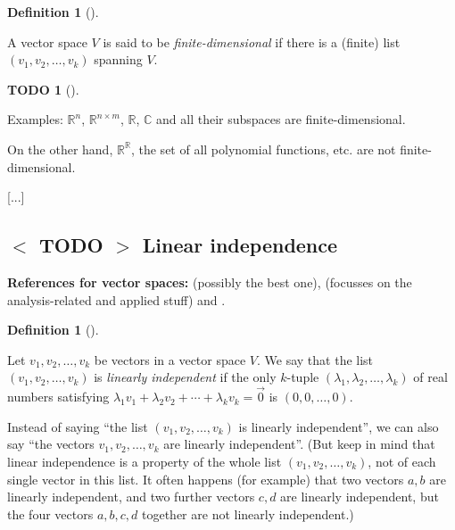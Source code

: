 \documentclass[numbers=enddot,12pt,final,onecolumn,notitlepage]{scrartcl}%
\theoremstyle{definition}
\newtheorem{defi}[theo]{Definition}
\newenvironment{definition}[1][]
{\begin{defi}[#1]\begin{leftbar}}
{\end{leftbar}\end{defi}}
\newtheorem{quest}[theo]{TODO}
\newenvironment{todo}[1][]
{\begin{quest}[#1]\begin{leftbar}}
{\end{leftbar}\end{quest}}
\begin{document}
\begin{definition}
A vector space $V$ is said to be \textit{finite-dimensional} if there is a
(finite) list $\left(  v_{1},v_{2},\ldots,v_{k}\right)  $ spanning $V$.
\end{definition}

\begin{todo}
Examples: $\mathbb{R}^{n}$, $\mathbb{R}^{n\times m}$, $\mathbb{R}$,
$\mathbb{C}$ and all their subspaces are finite-dimensional.

On the other hand, $\mathbb{R}^{\mathbb{R}}$, the set of all polynomial
functions, etc. are not finite-dimensional.
\end{todo}

[...]

\subsection{%
$<$%
TODO%
$>$
Linear independence}

\textbf{References for vector spaces:} \cite[\S 5.2]{LaNaSc16} (possibly the
best one), \cite[\S 2.3]{OlvSha06} (focusses on the analysis-related and
applied stuff) and \cite[Two.II]{Heffer16}.

\begin{definition}
\label{def.linind}Let $v_{1},v_{2},\ldots,v_{k}$ be vectors in a vector space
$V$. We say that the list $\left(  v_{1},v_{2},\ldots,v_{k}\right)  $ is
\textit{linearly independent} if the only $k$-tuple $\left(  \lambda
_{1},\lambda_{2},\ldots,\lambda_{k}\right)  $ of real numbers satisfying
$\lambda_{1}v_{1}+\lambda_{2}v_{2}+\cdots+\lambda_{k}v_{k}=\overrightarrow{0}$
is $\left(  0,0,\ldots,0\right)  $.

Instead of saying \textquotedblleft the list $\left(  v_{1},v_{2},\ldots
,v_{k}\right)  $ is linearly independent\textquotedblright, we can also say
\textquotedblleft the vectors $v_{1},v_{2},\ldots,v_{k}$ are linearly
independent\textquotedblright. (But keep in mind that linear independence is a
property of the whole list $\left(  v_{1},v_{2},\ldots,v_{k}\right)  $, not of
each single vector in this list. It often happens (for example) that two
vectors $a,b$ are linearly independent, and two further vectors $c,d$ are
linearly independent, but the four vectors $a,b,c,d$ together are not linearly independent.)
\end{definition}
\end{document}
